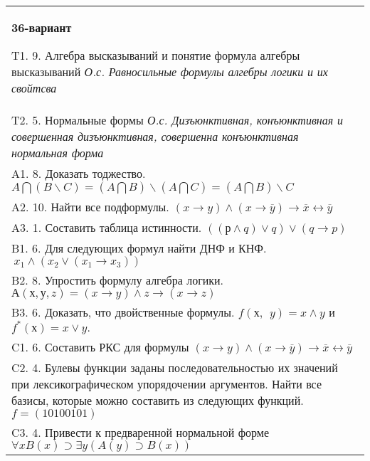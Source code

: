 \documentclass{article}
\begin{document}
\begin{tabular}{m{17cm}}
\textbf{36-вариант}
\newline

T1. 9. Алгебра высказываний и понятие формула алгебры высказываний \emph{О.с. Равносильные формулы алгебры логики и их свойтсва} \\
T2. 5. Нормальные формы \emph{О.с. Дизъюнктивная, конъюнктивная и совершенная дизъюнктивная, совершенна конъюнктивная нормальная форма} \\
A1. 8. Доказать тоджество. \(A\bigcap(B\backslash C) = (A\bigcap B)\backslash(A\bigcap C) = (A\bigcap B)\backslash C\) \\
A2. 10. Найти все подформулы. \((x \rightarrow y) \land (x \rightarrow \overline{y}) \rightarrow \overline{x} \leftrightarrow \overline{y}\) \\
A3. 1. Составить таблица истинности. \(\left( (р \land q) \vee q \right) \vee (q \rightarrow p)\) \\
B1. 6. Для следующих формул найти ДНФ и КНФ. \(\ x_{1} \land (x_{2} \vee (x_{1} \rightarrow x_{3}))\) \\
B2. 8. Упростить формулу алгебра логики. \(А(х,у,z) = (x \rightarrow y) \land z \rightarrow (x \rightarrow z)\) \\
B3. 6. Доказать, что двойственные формулы. \(f(х,\ \ y) = x \land y\) и \(f^{*}(х) = x \vee y.\) \\
C1. 6. Составить РКС для формулы \((x \rightarrow y) \land (x \rightarrow \overline{y}) \rightarrow \overline{x} \leftrightarrow \overline{y}\) \\
C2. 4. Булевы функции заданы последовательностью их значений при лексикографическом упорядочении аргументов. Найти все базисы, которые можно составить из следующих функций. \(f = (10100101)\) \\
C3. 4. Привести к предваренной нормальной форме \(\forall xB(x) \supset \exists y(A(y) \supset B(x))\) \\

\end{tabular}
\vspace{1cm}
\end{document}
